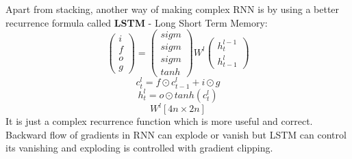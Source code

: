 \documentclass[12pt,a4paper]{article}
\begin{document}
Apart from stacking, another way of making complex RNN is by using a better recurrence formula called \textbf{LSTM} - Long Short Term Memory:
\begin{equation*}
    \begin{pmatrix}
  i \\ f \\ o \\ g 
\end{pmatrix} =
\begin{pmatrix}
  sigm \\ sigm \\ sigm \\ tanh 
\end{pmatrix} W^{l}
\begin{pmatrix}
  h_{t}^{l-1} \\ 
  h_{t-1}^l 
\end{pmatrix}
\end{equation*}
\begin{equation*}
    c_{t}^l = f \odot c_{t-1}^l + i \odot g
\end{equation*}
\begin{equation*}
    h_{t}^l = o \odot tanh(c_{t}^l)
\end{equation*}
\begin{equation*}
    W^{l} [4n \times 2n]
\end{equation*}
It is just a complex recurrence function which is more useful and correct. Backward flow of gradients in RNN can explode or vanish but LSTM can control its vanishing and exploding is controlled with gradient clipping.

\printbibliography
\end{document}
